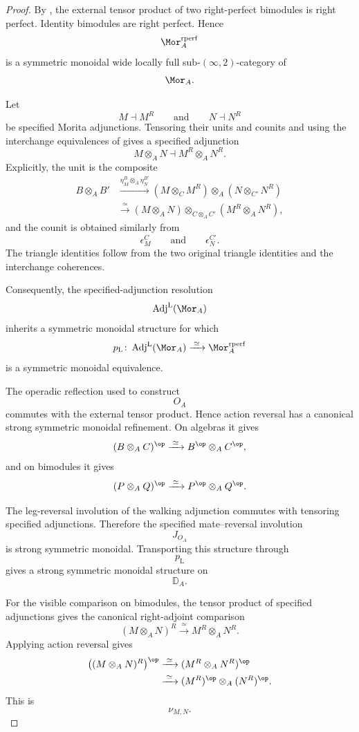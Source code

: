 \begin{proof}
By
,
the external tensor product of two right-perfect bimodules is right
perfect. Identity bimodules are right perfect. Hence
\[
    \Mor_A^{\mathrm{rperf}}
\]
is a symmetric monoidal wide locally full sub-$(\infty,2)$-category of
\[
    \Mor_A.
\]

Let
\[
    M\dashv M^R
    \qquad\text{and}\qquad
    N\dashv N^R
\]
be specified Morita adjunctions. Tensoring their units and counits and
using the interchange equivalences of
gives a specified adjunction
\[
    M\otimes_A N
    \dashv
    M^R\otimes_A N^R.
\]
Explicitly, the unit is the composite
\[
\begin{aligned}
    B\otimes_A B'
    &\xrightarrow{
        \eta_M^B\otimes_A\eta_N^{B'}
    }
    (M\otimes_C M^R)
    \otimes_A
    (N\otimes_{C'}N^R)
    \\
    &\xrightarrow{\;\simeq\;}
    (M\otimes_A N)
    \otimes_{C\otimes_A C'}
    (M^R\otimes_A N^R),
\end{aligned}
\]
and the counit is obtained similarly from
\[
    \epsilon_M^C
    \qquad\text{and}\qquad
    \epsilon_N^{C'}.
\]
The triangle identities follow from the two original triangle identities
and the interchange coherences.

Consequently, the specified-adjunction resolution
\[
    \operatorname{Adj}^{\mathrm L}(\Mor_A)
\]
inherits a symmetric monoidal structure for which
\[
    p_{\mathrm L}
    \colon
    \operatorname{Adj}^{\mathrm L}(\Mor_A)
    \xrightarrow{\;\simeq\;}
    \Mor_A^{\mathrm{rperf}}
\]
is a symmetric monoidal equivalence.

The operadic reflection used to construct
\[
    O_A
\]
commutes with the external tensor product. Hence action reversal has a
canonical strong symmetric monoidal refinement. On algebras it gives
\[
    (B\otimes_A C)^{\op}
    \xrightarrow{\;\simeq\;}
    B^{\op}\otimes_A C^{\op},
\]
and on bimodules it gives
\[
    (P\otimes_A Q)^{\op}
    \xrightarrow{\;\simeq\;}
    P^{\op}\otimes_A Q^{\op}.
\]

The leg-reversal involution of the walking adjunction commutes with
tensoring specified adjunctions. Therefore the specified
mate--reversal involution
\[
    J_{O_A}
\]
is strong symmetric monoidal. Transporting this structure through
\[
    p_{\mathrm L}
\]
gives a strong symmetric monoidal structure on
\[
    \mathbb D_A.
\]

For the visible comparison on bimodules, the tensor product of specified
adjunctions gives the canonical right-adjoint comparison
\[
    (M\otimes_A N)^R
    \xrightarrow{\;\simeq\;}
    M^R\otimes_A N^R.
\]
Applying action reversal gives
\[
\begin{aligned}
    \bigl(
        (M\otimes_A N)^R
    \bigr)^{\op}
    &\xrightarrow{\;\simeq\;}
    (M^R\otimes_A N^R)^{\op}
    \\
    &\xrightarrow{\;\simeq\;}
    (M^R)^{\op}\otimes_A(N^R)^{\op}.
\end{aligned}
\]
This is
\[
    \nu_{M,N}.
\]


\end{proof}
